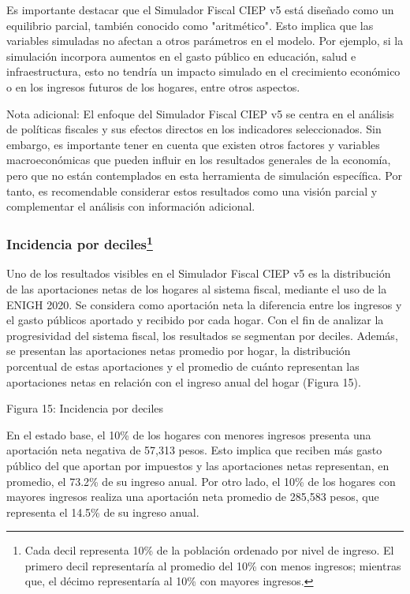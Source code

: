 Es importante destacar que el Simulador Fiscal CIEP v5 está diseñado
como un equilibrio parcial, también conocido como "aritmético". Esto
implica que las variables simuladas no afectan a otros parámetros en el
modelo. Por ejemplo, si la simulación incorpora aumentos en el gasto
público en educación, salud e infraestructura, esto no tendría un
impacto simulado en el crecimiento económico o en los ingresos futuros
de los hogares, entre otros aspectos.

Nota adicional: El enfoque del Simulador Fiscal CIEP v5 se centra en el
análisis de políticas fiscales y sus efectos directos en los indicadores
seleccionados. Sin embargo, es importante tener en cuenta que existen
otros factores y variables macroeconómicas que pueden influir en los
resultados generales de la economía, pero que no están contemplados en
esta herramienta de simulación específica. Por tanto, es recomendable
considerar estos resultados como una visión parcial y complementar el
análisis con información adicional.

\hypertarget{incidencia-por-deciles}{%
\subsubsection[Incidencia por deciles]{\texorpdfstring{Incidencia por
deciles\footnote{Cada decil representa 10\% de la población ordenado por
  nivel de ingreso. El primero decil representaría al promedio del 10\%
  con menos ingresos; mientras que, el décimo representaría al 10\% con
  mayores ingresos.}}{Incidencia por deciles}}\label{incidencia-por-deciles}}

Uno de los resultados visibles en el Simulador Fiscal CIEP v5 es la
distribución de las aportaciones netas de los hogares al sistema fiscal,
mediante el uso de la ENIGH 2020. Se considera como aportación neta la
diferencia entre los ingresos y el gasto públicos aportado y recibido
por cada hogar. Con el fin de analizar la progresividad del sistema
fiscal, los resultados se segmentan por deciles. Además, se presentan
las aportaciones netas promedio por hogar, la distribución porcentual de
estas aportaciones y el promedio de cuánto representan las aportaciones
netas en relación con el ingreso anual del hogar (Figura 15).

Figura 15: Incidencia por deciles


En el estado base, el 10\% de los hogares con menores ingresos presenta
una aportación neta negativa de 57,313 pesos. Esto implica que reciben
más gasto público del que aportan por impuestos y las aportaciones netas
representan, en promedio, el 73.2\% de su ingreso anual. Por otro lado,
el 10\% de los hogares con mayores ingresos realiza una aportación neta
promedio de 285,583 pesos, que representa el 14.5\% de su ingreso anual.

